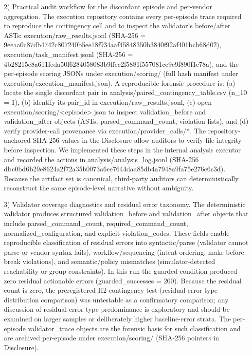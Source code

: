 \documentclass[conference]{IEEEtran}
\begin{document}
2) Practical audit workflow for the discordant episode and per‑vendor aggregation. The execution repository contains every per-episode trace required to reproduce the contingency cell and to inspect the validator's before/after ASTs: execution/raw\_results.jsonl (SHA-256 = 9eeaa0c87db4742c807240b5ee18f934aaf45848350b3840f92af401bcb68d02), execution/task\_manifest.jsonl (SHA-256 = 4b28215e8a611feda50f6284058083b9ffcc2f5881f557081ce9e9f890f1c78a), and the per-episode scoring JSONs under execution/scoring/ (full hash manifest under execution/execution\_manifest.json). A reproducible forensic procedure is: (a) locate the single discordant pair in analysis/paired\_contingency\_table.csv (n\_10 = 1), (b) identify its pair\_id in execution/raw\_results.jsonl, (c) open execution/scoring/<episode>.json to inspect validation\_before and validation\_after objects (ASTs, parsed\_command\_count, violation lists), and (d) verify provider-call provenance via execution/provider\_calls/*. The repository-anchored SHA‑256 values in the Disclosure allow auditors to verify file integrity before inspection. We implemented these steps in the internal analysis executor and recorded the actions in analysis/analysis\_log.jsonl (SHA-256 = dbc0bd6b29e8624a2f72a35b0073a6ee7644daa85db4a7948a9fa75e276c6c3d). Because the artifact set is canonical, third-party auditors can deterministically reconstruct the same episode-level narrative without ambiguity.

3) Validator coverage diagnostics and residual error taxonomy. The deterministic validator produces structured validation\_before and validation\_after objects that include parsed\_command\_count, required\_command\_count, normalized\_configuration, and explicit violation\_codes. These fields enable reproducible classification of residual errors into syntactic/parse (validator cannot parse or vendor-syntax fails), workflow/sequencing (intent-ordering, make-before-break violations), and semantic/policy mismatches (simulator-detected reachability or group constraints). In this run the guarded condition produced zero residual actionable errors (guarded\_successes = 200). Because the residual count is zero, the preregistered H2 contingency test (residual error-type distribution comparison) was untestable as a confirmatory comparison; any discussion of residual error-type predominance is exploratory and should be examined on larger samples or deliberately higher baseline-error strata. The per-episode validator\_trace objects are the forensic basis for such classification and are archived per-episode under execution/scoring/ (SHA-256 pointers in Disclosure).
\end{document}
